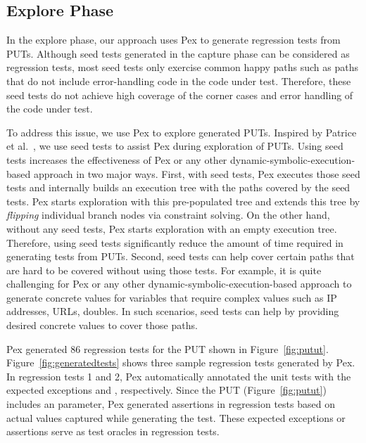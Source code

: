 \subsection{Explore Phase}
\label{sec:explore}

In the explore phase, our approach uses Pex to generate regression tests from PUTs. Although seed tests generated in the capture phase can be considered as regression tests, most seed tests only exercise common happy paths such as paths that do not include error-handling code in the code under test. Therefore, these seed tests do not achieve high coverage of the corner cases and error handling of the code under test.

To address this issue, we use Pex to explore generated PUTs. Inspired by Patrice et al.~\cite{patrice08:whitebox}, we use seed tests to assist Pex during exploration of PUTs. Using seed tests increases the effectiveness of Pex or any other dynamic-symbolic-execution-based approach in two major ways. First, with seed tests, Pex executes those seed tests and internally builds an execution tree with the paths covered by the seed tests. Pex starts exploration with this pre-populated tree and extends this tree by \emph{flipping} individual branch nodes via constraint solving. On the other hand, without any seed tests, Pex starts exploration with an empty execution tree. Therefore, using seed tests significantly reduce the amount of time required in generating tests from PUTs. Second, seed tests can help cover certain paths that are hard to be covered without using those tests. For example, it is quite challenging for Pex or any other dynamic-symbolic-execution-based approach to generate concrete values for variables
that require complex values such as IP addresses, URLs, doubles. In such scenarios, seed tests can help by providing desired concrete values to cover those paths.

Pex generated $86$ regression tests for the PUT shown in Figure~\ref{fig:putut}. Figure~\ref{fig:generatedtests} shows three sample regression tests generated by Pex. In regression tests 1 and 2, Pex automatically annotated the unit tests with the expected exceptions  and , respectively. Since the PUT (Figure~\ref{fig:putut}) includes an  parameter, Pex generated assertions in regression tests based on actual values captured while 
generating the test. These expected exceptions or assertions serve as test oracles in regression tests.

